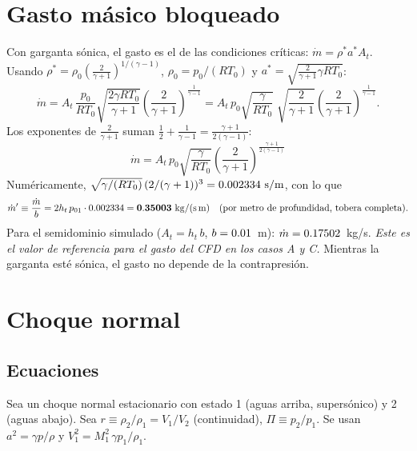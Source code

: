 \documentclass[11pt,a4paper]{article}
\newcommand{\As}{A^{*}}
\begin{document}
\begin{table}[H]\centering\small
\caption{Newton--Raphson, rama supersónica ($A/\As=\ARr$, $M_0=2$).}\label{tab:nsup}
\end{table}
\begin{table}[H]\centering\small
\caption{Newton--Raphson, rama subsónica ($A/\As=\ARr$, $M_0=0.4$).}\label{tab:nsub}
\end{table}

\section{Gasto másico bloqueado}
Con garganta sónica, el gasto es el de las condiciones críticas: $\dot m=\rho^*a^*A_t$. Usando
$\rho^*=\rho_0\left(\tfrac{2}{\gamma+1}\right)^{1/(\gamma-1)}$, $\rho_0=p_0/(RT_0)$ y
$a^*=\sqrt{\tfrac{2}{\gamma+1}\gamma RT_0}$:
\[
\dot m=A_t\,\frac{p_0}{RT_0}\sqrt{\frac{2\gamma RT_0}{\gamma+1}}\left(\frac{2}{\gamma+1}\right)^{\frac{1}{\gamma-1}}
=A_t\,p_0\sqrt{\frac{\gamma}{RT_0}}\;\sqrt{\frac{2}{\gamma+1}}\left(\frac{2}{\gamma+1}\right)^{\frac{1}{\gamma-1}}.
\]
Los exponentes de $\tfrac{2}{\gamma+1}$ suman $\tfrac12+\tfrac1{\gamma-1}=\tfrac{\gamma+1}{2(\gamma-1)}$:
\begin{equation}
\boxed{\dot m=A_t\,p_0\sqrt{\frac{\gamma}{RT_0}}\left(\frac{2}{\gamma+1}\right)^{\frac{\gamma+1}{2(\gamma-1)}}}\label{eq:mdot}
\end{equation}
Numéricamente, $\sqrt{\gamma/(RT_0)}\,(2/(\gamma+1))^{3}=\coefm\ \mathrm{s/m}$, con lo que
\[
\dot m'\equiv\frac{\dot m}{b}=2h_t\,p_{01}\cdot\coefm=\mathbf{\mdotfull}\ \mathrm{kg/(s\,m)}
\quad\text{(por metro de profundidad, tobera completa).}
\]
Para el semidominio simulado ($A_t=h_t\,b$, $b=0.01$~m): $\dot m=0.17502$~kg/s. \emph{Este es el valor de
referencia para el gasto del CFD en los casos A y C.} Mientras la garganta esté sónica, el gasto no depende de la contrapresión.

\section{Choque normal}
\subsection{Ecuaciones}
Sea un choque normal estacionario con estado 1 (aguas arriba, supersónico) y 2 (aguas abajo). Sea $r\equiv\rho_2/\rho_1=V_1/V_2$ (continuidad),
$\Pi\equiv p_2/p_1$. Se usan $a^2=\gamma p/\rho$ y $V_1^2=M_1^2\,\gamma p_1/\rho_1$.
\end{document}
